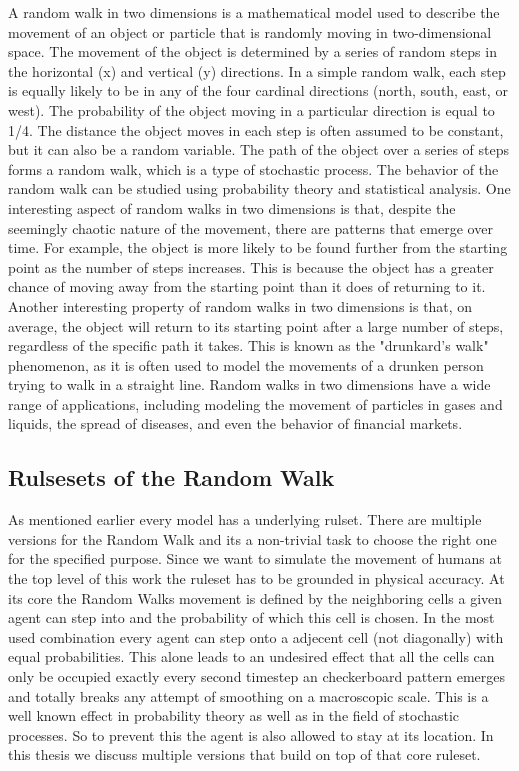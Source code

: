 A random walk in two dimensions is a mathematical model used to describe the movement of an object or particle that is randomly moving in two-dimensional space. The movement of the object is determined by a series of random steps in the horizontal (x) and vertical (y) directions.
In a simple random walk, each step is equally likely to be in any of the four cardinal directions (north, south, east, or west). The probability of the object moving in a particular direction is equal to 1/4. The distance the object moves in each step is often assumed to be constant, but it can also be a random variable.
The path of the object over a series of steps forms a random walk, which is a type of stochastic process. The behavior of the random walk can be studied using probability theory and statistical analysis.
One interesting aspect of random walks in two dimensions is that, despite the seemingly chaotic nature of the movement, there are patterns that emerge over time. For example, the object is more likely to be found further from the starting point as the number of steps increases. This is because the object has a greater chance of moving away from the starting point than it does of returning to it.
Another interesting property of random walks in two dimensions is that, on average, the object will return to its starting point after a large number of steps, regardless of the specific path it takes. This is known as the "drunkard's walk" phenomenon, as it is often used to model the movements of a drunken person trying to walk in a straight line.
Random walks in two dimensions have a wide range of applications, including modeling the movement of particles in gases and liquids, the spread of diseases, and even the behavior of financial markets.

\subsection{Rulsesets of the Random Walk}
As mentioned earlier every model has a underlying rulset. There are multiple versions for the Random Walk and its a non-trivial task to choose the right one for the specified purpose. 
Since we want to simulate the movement of humans at the top level of this work the ruleset has to be grounded in physical accuracy. 
At its core the Random Walks movement is defined by the neighboring cells a given agent can step into and the probability of which this cell is chosen. 
In the most used combination every agent can step onto a adjecent cell (not diagonally) with equal probabilities.
This alone leads to an undesired effect that all the cells can only be occupied exactly every second timestep an checkerboard pattern emerges and totally breaks any attempt of smoothing on a macroscopic scale. 
This is a well known effect in probability theory as well as in the field of stochastic processes.
So to prevent this the agent is also allowed to stay at its location. 
In this thesis we discuss multiple versions that build on top of that core ruleset. 


